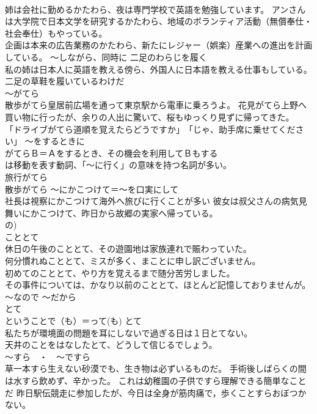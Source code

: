 \documentclass[8pt]{extreport}
\begin{document}
\begin{CJK}{UTF8}{min}
\\	姉は会社に勤めるかたわら、夜は専門学校で英語を勉強しています。 アンさんは大学院で日本文学を研究するかたわら、地域のボランティア活動（無償奉仕・社会奉仕）もやっている。 
\\	企画は本来の広告業務のかたわら、新たにレジャー（娯楽）産業への進出を計画している。	～しながら、同時に	二足のわらじを履く
\\	私の姉は日本人に英語を教える傍ら、外国人に日本語を教える仕事もしている。二足の草鞋を履いているわけだ
\\	～がてら
\\	散歩がてら皇居前広場を通って東京駅から電車に乗ろうよ。 花見がてら上野へ買い物に行ったが、余りの人出に驚いて、桜もゆっくり見ずに帰ってきた。 
\\	「ドライブがてら道順を覚えたらどうですか」　「じゃ、助手席に乗せてください」	～をするときに 
\\	がてらＢ＝Ａをするとき、その機会を利用してＢもする 
\\	は移動を表す動詞、「～に行く」の意味を持つ名詞が多い。 
\\	旅行がてら　
\\	散歩がてら	～にかこつけて＝～を口実にして　
\\	社長は視察にかこつけて海外へ旅びに行くことが多い 彼女は叔父さんの病気見舞いにかこつけて、昨日から故郷の実家へ帰っている。
\\	の)
\\	こととて	
\\	休日の午後のこととて、その遊園地は家族連れで賑わっていた。
\\	何分慣れぬこととて、ミスが多く、まことに申し訳ございません。
\\	初めてのこととて、やり方を覚えるまで随分苦労しました。 
\\	その事件については、かなり以前のこととて、ほとんど記憶しておりませんが。
\\	～なので ～だから 
\\	とて 
\\	ということで（も）＝って(も)	とて 
\\	私たちが環境面の問題を耳にしないで過ぎる日は１日とてない。 
\\	天井のことをはなしたとて、どうして信じるでしょう。 
\\	～すら　・　～ですら	
\\	草一本すら生えない砂漠でも、生き物は必ずいるものだ。 手術後しばらくの間は水すら飲めず、辛かった。 これは幼稚園の子供ですら理解できる簡単なことだ 昨日駅伝競走に参加したが、今日は全身が筋肉痛で，歩くことすらおぼつかない。

\end{CJK}
\end{document}
